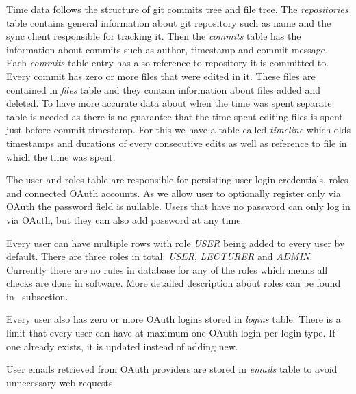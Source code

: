 Time data follows the structure of git commits tree and file tree.
The \textit{repositories} table contains general information about git repository such as name and the sync client
responsible for tracking it.
Then the \textit{commits} table has the information about commits such as author, timestamp and commit message.
Each \textit{commits} table entry has also reference to repository it is committed to.
Every commit has zero or more files that were edited in it.
These files are contained in \textit{files} table and they contain information about files added and deleted.
To have more accurate data about when the time was spent separate table is needed as there is no guarantee that
the time spent editing files is spent just before commit timestamp.
For this we have a table called \textit{timeline} which olds timestamps and durations of every consecutive edits as
well as reference to file in which the time was spent.

The user and roles table are responsible for persisting user login credentials, roles and connected OAuth accounts.
As we allow user to optionally register only via OAuth the password field is nullable.
Users that have no password can only log in via OAuth, but they can also add password at any time.

Every user can have multiple rows with role \textit{USER} being added to every user by default.
There are three roles in total: \textit{USER}, \textit{LECTURER} and \textit{ADMIN}.
Currently there are no rules in database for any of the roles which means all checks are done in software.
More detailed description about roles can be found in~ subsection.

Every user also has zero or more OAuth logins stored in \textit{logins} table.
There is a limit that every user can have at maximum one OAuth login per login type.
If one already exists, it is updated instead of adding new.

User emails retrieved from OAuth providers are stored in \textit{emails} table to avoid unnecessary web requests.

